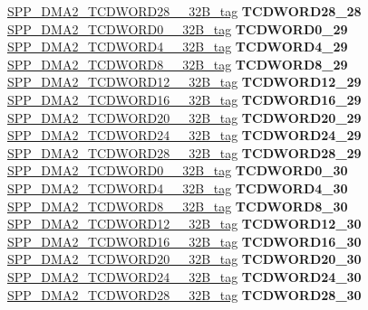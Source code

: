 \begin{DoxyCompactItemize}
\begin{tabbing}
\>\>\mbox{\hyperlink{unionSPP__DMA2__TCDWORD28____32B__tag}{SPP\_DMA2\_TCDWORD28\_\_32B\_tag}} {\bfseries TCDWORD28\_28}\\
\>\>\mbox{\hyperlink{unionSPP__DMA2__TCDWORD0____32B__tag}{SPP\_DMA2\_TCDWORD0\_\_32B\_tag}} {\bfseries TCDWORD0\_29}\\
\>\>\mbox{\hyperlink{unionSPP__DMA2__TCDWORD4____32B__tag}{SPP\_DMA2\_TCDWORD4\_\_32B\_tag}} {\bfseries TCDWORD4\_29}\\
\>\>\mbox{\hyperlink{unionSPP__DMA2__TCDWORD8____32B__tag}{SPP\_DMA2\_TCDWORD8\_\_32B\_tag}} {\bfseries TCDWORD8\_29}\\
\>\>\mbox{\hyperlink{unionSPP__DMA2__TCDWORD12____32B__tag}{SPP\_DMA2\_TCDWORD12\_\_32B\_tag}} {\bfseries TCDWORD12\_29}\\
\>\>\mbox{\hyperlink{unionSPP__DMA2__TCDWORD16____32B__tag}{SPP\_DMA2\_TCDWORD16\_\_32B\_tag}} {\bfseries TCDWORD16\_29}\\
\>\>\mbox{\hyperlink{unionSPP__DMA2__TCDWORD20____32B__tag}{SPP\_DMA2\_TCDWORD20\_\_32B\_tag}} {\bfseries TCDWORD20\_29}\\
\>\>\mbox{\hyperlink{unionSPP__DMA2__TCDWORD24____32B__tag}{SPP\_DMA2\_TCDWORD24\_\_32B\_tag}} {\bfseries TCDWORD24\_29}\\
\>\>\mbox{\hyperlink{unionSPP__DMA2__TCDWORD28____32B__tag}{SPP\_DMA2\_TCDWORD28\_\_32B\_tag}} {\bfseries TCDWORD28\_29}\\
\>\>\mbox{\hyperlink{unionSPP__DMA2__TCDWORD0____32B__tag}{SPP\_DMA2\_TCDWORD0\_\_32B\_tag}} {\bfseries TCDWORD0\_30}\\
\>\>\mbox{\hyperlink{unionSPP__DMA2__TCDWORD4____32B__tag}{SPP\_DMA2\_TCDWORD4\_\_32B\_tag}} {\bfseries TCDWORD4\_30}\\
\>\>\mbox{\hyperlink{unionSPP__DMA2__TCDWORD8____32B__tag}{SPP\_DMA2\_TCDWORD8\_\_32B\_tag}} {\bfseries TCDWORD8\_30}\\
\>\>\mbox{\hyperlink{unionSPP__DMA2__TCDWORD12____32B__tag}{SPP\_DMA2\_TCDWORD12\_\_32B\_tag}} {\bfseries TCDWORD12\_30}\\
\>\>\mbox{\hyperlink{unionSPP__DMA2__TCDWORD16____32B__tag}{SPP\_DMA2\_TCDWORD16\_\_32B\_tag}} {\bfseries TCDWORD16\_30}\\
\>\>\mbox{\hyperlink{unionSPP__DMA2__TCDWORD20____32B__tag}{SPP\_DMA2\_TCDWORD20\_\_32B\_tag}} {\bfseries TCDWORD20\_30}\\
\>\>\mbox{\hyperlink{unionSPP__DMA2__TCDWORD24____32B__tag}{SPP\_DMA2\_TCDWORD24\_\_32B\_tag}} {\bfseries TCDWORD24\_30}\\
\>\>\mbox{\hyperlink{unionSPP__DMA2__TCDWORD28____32B__tag}{SPP\_DMA2\_TCDWORD28\_\_32B\_tag}} {\bfseries TCDWORD28\_30}\\

\end{tabbing}
\end{DoxyCompactItemize}
